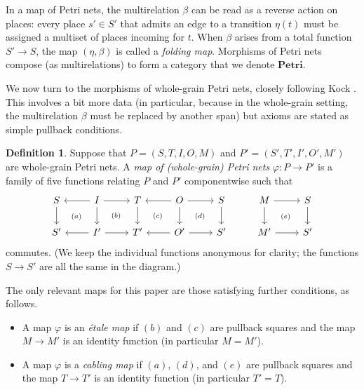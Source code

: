 \documentclass[11pt,a4paper]{article}
\theoremstyle{plain}
\theoremstyle{definition}
\newtheorem{definition}[theorem]{Definition}
\theoremstyle{remark}
\newcommand{\Petri}{\mathbf{Petri}}
\begin{document}
In a map of Petri nets, the multirelation $\beta$ can be read as a reverse action on places: every
place $s' \in S'$ that admits an edge to a transition $\eta(t)$ must be
assigned a multiset of places incoming for $t$. When $\beta$ arises from a total function $S' \to S$, the map $(\eta, \beta)$ is called a \emph{folding map}. Morphisms of Petri nets compose (as multirelations) to form a category that we denote $\Petri$.

We now turn to the morphisms of whole-grain Petri nets, closely following
Kock \cite{WGPN}. This involves a bit more data (in particular,
because in the whole-grain setting, the multirelation $\beta$ must be
replaced by another span) but axioms are stated as simple pullback
conditions.

\begin{definition}
  \label{def:map-whole-grain}
  Suppose that $P = (S,T,I,O, M)$ and $P' = (S', T', I', O', M')$ are
  whole-grain Petri nets. A \emph{map of (whole-grain) Petri nets}
  $\varphi : P \rightarrow P'$ is a family of five functions
  relating $P$ and $P'$ componentwise such that
\[\begin{tikzcd}
	S & I & T & O & S & M & S \\
	{S'} & {I'} & {T'} & {O'} & {S'} & {M'} & {S'}
	\arrow[from=1-1, to=2-1]
	\arrow["{(a)}"{description}, draw=none, from=1-1, to=2-2]
	\arrow[from=1-2, to=1-1]
	\arrow[from=1-2, to=1-3]
	\arrow[from=1-2, to=2-2]
	\arrow["{(b)}"{description}, draw=none, from=1-2, to=2-3]
	\arrow[from=1-3, to=2-3]
	\arrow["{(c)}"{description}, draw=none, from=1-3, to=2-4]
	\arrow[from=1-4, to=1-3]
	\arrow[from=1-4, to=1-5]
	\arrow[from=1-4, to=2-4]
	\arrow["{(d)}"{description}, draw=none, from=1-4, to=2-5]
	\arrow[from=1-5, to=2-5]
	\arrow[from=1-6, to=1-7]
	\arrow[from=1-6, to=2-6]
	\arrow["{(e)}"{description}, draw=none, from=1-6, to=2-7]
	\arrow[from=1-7, to=2-7]
	\arrow[from=2-2, to=2-1]
	\arrow[from=2-2, to=2-3]
	\arrow[from=2-4, to=2-3]
	\arrow[from=2-4, to=2-5]
	\arrow[from=2-6, to=2-7]
\end{tikzcd}\] commutes. (We keep the individual functions anonymous for
clarity; the functions $S \to S'$ are all the same in the diagram.) 

The only relevant maps for
this paper are those satisfying further conditions, as follows.
\begin{itemize}
\item A map $\varphi$ is an \emph{\'etale map} if $(b)$ and $(c)$ are
  pullback squares and the map $M \to M'$ is an identity function (in
  particular $M = M'$).
  \item A map $\varphi$ is a \emph{cabling map} if $(a)$, $(d)$, and $(e)$ are
        pullback squares and the map $T \to T'$ is an identity function (in
        particular $T' = T$).
\end{itemize}
\end{definition}
\end{document}
